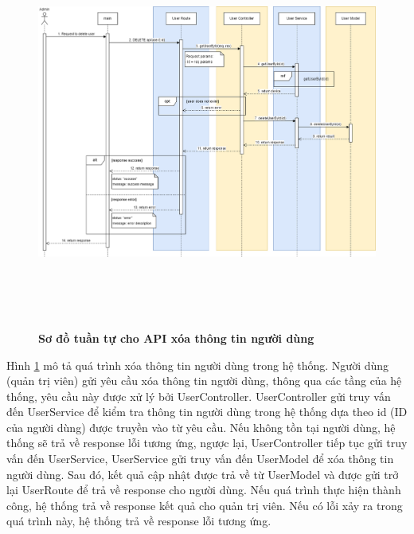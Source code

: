 \begin{figure}[H]
  \centering
  \includegraphics[width=16cm,height=13cm]{Images/sequence_api/deleteUserById.png}
  \caption[Sơ đồ tuần tự cho API xóa thông tin người dùng ]{\bfseries \fontsize{12pt}{0pt}
  \selectfont Sơ đồ tuần tự cho API xóa thông tin người dùng }
  \label{deleteUser} %
\end{figure}
Hình \ref{deleteUser} mô tả quá trình xóa thông tin người dùng trong hệ thống. Người dùng (quản trị viên) gửi yêu cầu xóa thông tin người dùng, thông qua các tầng của hệ thống, 
yêu cầu này được xử lý bởi UserController. UserController gửi truy vấn đến UserService để kiểm tra thông tin người dùng trong hệ thống dựa theo id (ID của người dùng) được truyền vào từ yêu cầu. 
Nếu không tồn tại người dùng, hệ thống sẽ trả về response lỗi tương ứng, ngược lại, UserController tiếp tục gửi truy vấn đến UserService, UserService gửi truy vấn đến UserModel để xóa thông tin
người dùng. Sau đó, kết quả cập nhật được trả về từ UserModel và được gửi trở lại UserRoute để trả về response cho người dùng. Nếu quá trình thực hiện thành công, hệ thống trả về response kết quả cho quản trị viên. Nếu có lỗi xảy ra
 trong quá trình này, hệ thống trả về response lỗi tương ứng.





